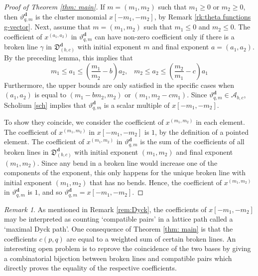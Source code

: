 \documentclass[11pt]{amsart}
\newcommand{\saySS}[1]{\say[SS]{#1}}
\theoremstyle{remark}
\newtheorem{remark}[theorem]{Remark}
\numberwithin{equation}{section}
\begin{document}
\begin{proof}[Proof of Theorem \ref{thm: main}]

If $m=(m_1,m_2)$ such that $m_1\geq0$ or $m_2\geq0$, then $\vartheta_{q,m}^\mathbf{d}$ is the cluster monomial $x[-m_1,-m_2]$, by Remark \ref{rk:theta functions g-vector}.
Next, assume that $m=(m_1,m_2)$ such that $m_1\leq0$ and $m_2\leq0$.
The coefficient of $x^{(a_1,a_2)}$ in $\vartheta_{q,m}^\mathbf{d}$ can have non-zero coefficient only if there is a broken line $\gamma$ in $\mathfrak{D}^\mathbf{d}_{(b,c)}$ with initial exponent $m$ and final exponent $a=(a_1,a_2)$.  By the preceding lemma, this implies that 
\[ m_1\leq a_1\leq \left(\frac{m_1}{m_2}-b\right)a_2,\;\;\; m_2\leq a_2\leq \left(\frac{m_2}{m_1}-c\right)a_1\]
Furthermore, the upper bounds are only satisfied in the specific cases when $(a_1,a_2)$ is equal to $(m_1-bm_2,m_2)$ or $(m_1,m_2-cm_1)$.  
Since $\vartheta_{q,m}^\mathbf{d}\in \mathcal{A}_{b,c}$, Scholium \ref{sch} implies that $\vartheta_{q,m}^\mathbf{d}$ is a scalar multiple of $x[-m_1,-m_2]$. 

To show they coincide, we consider the coefficient of $x^{(m_1,m_2)}$ in each element.  The coefficient of $x^{(m_1,m_2)}$ in $x[-m_1,-m_2]$ is $1$, by the definition of a pointed element. The coefficient of $x^{(m_1,m_2)}$ in $\vartheta_{q,m}^\mathbf{d}$ is the sum of the coefficients of all broken lines in $\mathfrak{D}_{(b,c)}^\mathbf{d}$ with initial exponent $(m_1,m_2)$ and final exponent $(m_1,m_2)$.  Since any bend in a broken line would increase one of the components of the exponent, this only happens for the unique broken line with initial exponent $(m_1,m_2)$ that has no bends. Hence, the coefficient of $x^{(m_1,m_2)}$ in $\vartheta_{q,m}^\mathbf{d}$ is $1$, and so $\vartheta_{q,m}^\mathbf{d}=x[-m_1,-m_2]$.
\end{proof}

\begin{remark}
As mentioned in Remark \ref{rem:Dyck}, the coefficients of $x[-m_1,-m_2]$ may be interpreted as counting `compatible pairs' in a lattice path called a `maximal Dyck path'.  One consequence of Theorem \ref{thm: main} is that the coefficients $c(p,q)$ are equal to a weighted sum of certain broken lines.  An interesting open problem is to reprove the coincidence of the two bases by giving a combinatorial bijection between broken lines and compatible pairs which directly proves the equality of the respective coefficients.
\end{remark}
\end{document}
